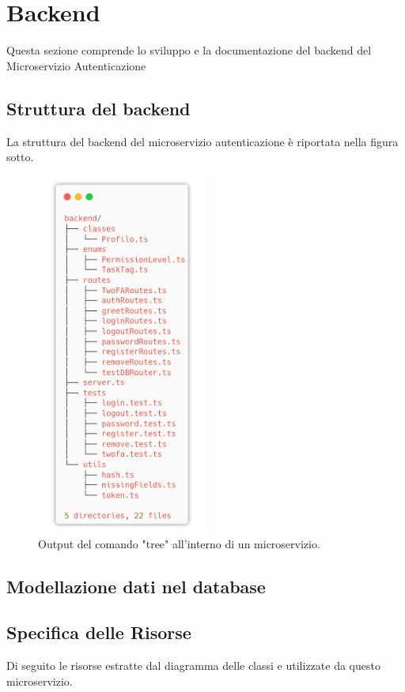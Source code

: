 \documentclass{report}
\begin{document}
\section{Backend}

Questa sezione comprende lo sviluppo e la documentazione del backend del Microservizio Autenticazione

\subsection*{Struttura del backend}
La struttura del backend del microservizio autenticazione è riportata
nella figura sotto.
\begin{figure}[H]
	\centering\includegraphics[width=0.5\textwidth]{images/microservizio-autenticazione/backend-structure.png}
	\caption{Output del comando "tree" all'interno di un microservizio.}
\end{figure}
\subsection*{Modellazione dati nel database}
\subsection*{Specifica delle Risorse}
Di seguito le risorse estratte dal diagramma delle classi e utilizzate da questo microservizio.
\end{document}
